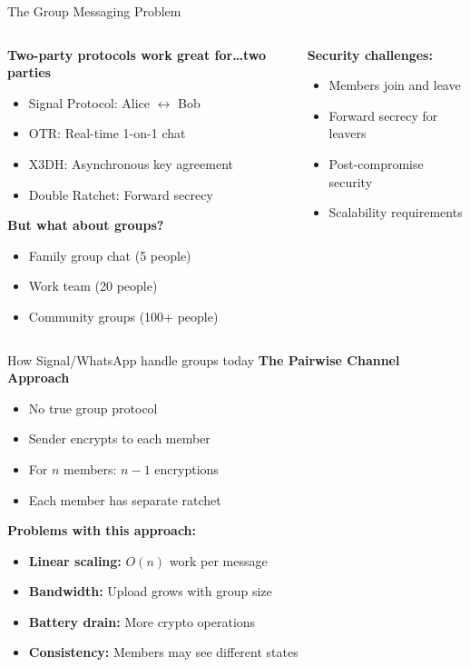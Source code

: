 \documentclass[aspectratio=169, lualatex, handout]{beamer}
\begin{document}
\begin{frame}{The Group Messaging Problem}
	\begin{columns}[c]
		\begin{column}{0.5\textwidth}
			\textbf{Two-party protocols work great for\ldots two parties}
			\begin{itemize}
				\item Signal Protocol: Alice $\leftrightarrow$ Bob
				\item OTR: Real-time 1-on-1 chat
				\item X3DH: Asynchronous key agreement
				\item Double Ratchet: Forward secrecy
			\end{itemize}
			\textbf{But what about groups?}
			\begin{itemize}
				\item Family group chat (5 people)
				\item Work team (20 people)
				\item Community groups (100+ people)
			\end{itemize}
		\end{column}
		\begin{column}{0.5\textwidth}
			\textbf{Security challenges:}
			\begin{itemize}
				\item Members join and leave
				\item Forward secrecy for leavers
				\item Post-compromise security
				\item Scalability requirements
			\end{itemize}
		\end{column}
	\end{columns}
\end{frame}

\begin{frame}{How Signal/WhatsApp handle groups today}
	\textbf{The Pairwise Channel Approach}
	\begin{itemize}
		\item No true group protocol
		\item Sender encrypts to each member
		\item For $n$ members: $n-1$ encryptions
		\item Each member has separate ratchet
	\end{itemize}
	\textbf{Problems with this approach:}
	\begin{itemize}
		\item \textbf{Linear scaling:} $O(n)$ work per message
		\item \textbf{Bandwidth:} Upload grows with group size
		\item \textbf{Battery drain:} More crypto operations
		\item \textbf{Consistency:} Members may see different states
	\end{itemize}
\end{frame}
\end{document}
